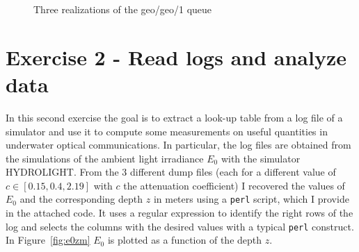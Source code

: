 \documentclass[10pt]{article}
\begin{document}
\begin{figure}[h!]
	\centering
	\caption{Three realizations of the geo/geo/1 queue}
	\label{fig:gg1_real}
\end{figure}



\section*{Exercise 2 - Read logs and analyze data}
In this second exercise the goal is to extract a look-up table from a log file of a simulator and use it to compute some measurements on useful quantities in underwater optical communications. In particular, the log files are obtained from the simulations of the ambient light irradiance $E_0$ with the simulator HYDROLIGHT. From the 3 different dump files (each for a different value of $c \in [0.15, 0.4, 2.19]$ with $c$ the attenuation coefficient) I recovered the values of $E_0$ and the corresponding depth $z$ in meters using a \texttt{perl} script, which I provide in the attached code. It uses a regular expression to identify the right rows of the log and selects the columns with the desired values with a typical \texttt{perl} construct. In Figure~\ref{fig:e0zm} $E_0$ is plotted as a function of the depth $z$.
\end{document}
